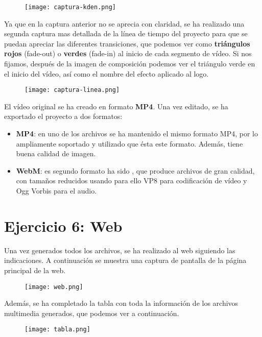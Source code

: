 \begin{figure}[H]
    \centering
    \texttt{[image: captura-kden.png]}
\end{figure}

Ya que en la captura anterior no se aprecia con claridad, se ha realizado una segunda captura mas detallada de la línea de tiempo del proyecto para que se puedan apreciar las diferentes transiciones, que podemos ver como \textbf{triángulos rojos} (fade-out) o \textbf{verdes} (fade-in) al inicio de cada segmento de vídeo. Si nos fijamos, después de la imagen de composición podemos ver el triángulo verde en el inicio del vídeo, así como el nombre del efecto aplicado al logo.

\begin{figure}[H]
    \centering
    \texttt{[image: captura-linea.png]}
\end{figure}


El vídeo original se ha creado en formato \textbf{MP4}. Una vez editado, se ha exportado el proyecto a dos formatos:

\begin{itemize}
    \item \textbf{MP4}: en uno de los archivos se ha mantenido el mismo formato MP4, por lo ampliamente soportado y utilizado que ésta este formato. Además, tiene buena calidad de imagen.

    \item \textbf{WebM}: es segundo formato ha sido , que produce archivos de gran calidad, con tamaños reducidos usando para ello VP8 para codificación de vídeo y Ogg Vorbis para el audio.
\end{itemize}

\section{Ejercicio 6: Web}
Una vez generados todos los archivos, se ha realizado al web siguiendo las indicaciones. A continuación se muestra una captura de pantalla de la página principal de la web.

\begin{figure}[H]
    \centering
    \texttt{[image: web.png]}
\end{figure}

Además, se ha completado la tabla con toda la información de los archivos multimedia generados, que podemos ver a continuación.

\begin{figure}[H]
    \centering
    \texttt{[image: tabla.png]}
\end{figure}


%
%

